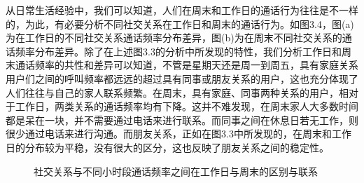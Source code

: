 从日常生活经验中，我们可以知道，人们在周末和工作日的通话行为往往是不一样的，为此，有必要分析不同社交关系在工作日和周末的通话行为。如图3.4，图(a)为在工作日的不同社交关系通话频率分布差异，图(b)为在周末不同社交关系的通话频率分布差异。除了在上述图3.3的分析中所发现的特性，我们分析工作日和周末通话频率的共性和差异可以知道，不管是星期天还是周一到周五，具有家庭关系用户们之间的呼叫频率都远远的超过具有同事或朋友关系的用户，这也充分体现了人们往往与自己的家人联系频繁。在周末，具有家庭、同事两种关系的用户，相对于工作日，两类关系的通话频率均有下降。这并不难发现，在周末家人大多数时间都是呆在一块，并不需要通过电话来进行联系。而同事之间在休息日若无工作，则很少通过电话来进行沟通。而朋友关系，正如在图3.3中所发现的，在周末和工作日的分布较为平稳，没有很大的区分，这也反映了朋友关系之间的稳定性。


\begin{figure}[!ht]
    \centering
    \hspace{7em} %
    \caption{社交关系与不同小时段通话频率之间在工作日与周末的区别与联系}
    \label{fig-sub}
\end{figure}

